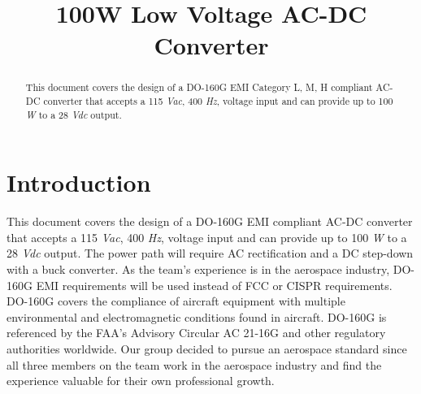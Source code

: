 \documentclass[conference]{IEEEtran}
\begin{document}
\title{100W Low Voltage AC-DC Converter\\}


\author{
\and
{}
\and
{}
}

\maketitle

\begin{abstract}
This document covers the design of a DO-160G EMI Category L, M, H compliant AC-DC converter that accepts a 115 \textit{Vac}, 400 \textit{Hz}, voltage input
and can provide up to 100 \textit{W} to a 28 \textit{Vdc} output.
\end{abstract}

\section{Introduction}
This document covers the design of a DO-160G EMI compliant AC-DC converter that accepts a 115 \textit{Vac}, 400 \textit{Hz}, voltage input
and can provide up to 100 \textit{W} to a 28 \textit{Vdc} output. The power path will require AC rectification and a DC step-down with a buck converter. As the team's experience is in the aerospace industry, DO-160G EMI requirements will be used instead of FCC or CISPR requirements. DO-160G covers the compliance of aircraft equipment with multiple environmental and electromagnetic conditions found in aircraft. DO-160G is referenced by the FAA’s Advisory Circular AC 21-16G and other regulatory authorities worldwide. Our group decided to pursue an aerospace standard since all three members on the team work in the aerospace industry and find the experience valuable for their own professional growth.
\end{document}
